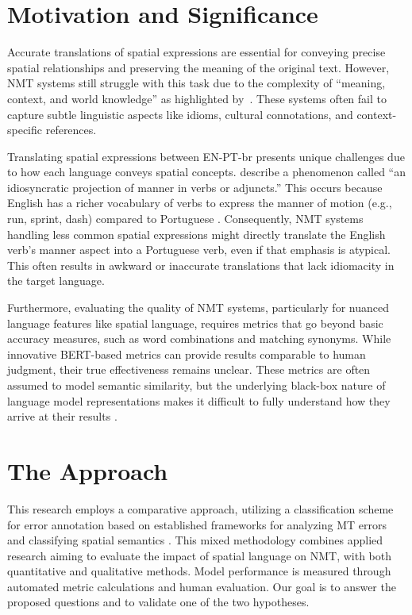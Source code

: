 \section{Motivation and Significance}

Accurate translations of spatial expressions are essential for conveying precise spatial relationships and preserving the meaning of the original text. However, NMT systems still struggle with this task due to the complexity of ``meaning, context, and world knowledge'' as highlighted by~\textcite[p.18]{house2018}. These systems often fail to capture subtle linguistic aspects like idioms, cultural connotations, and context-specific references.

Translating spatial expressions between EN-PT-br presents unique challenges due to how each language conveys spatial concepts. \textcite{fernandes-etal-2024-spatial} describe a phenomenon called ``an idiosyncratic projection of manner in verbs or adjuncts.'' This occurs because English has a richer vocabulary of verbs to express the manner of motion (e.g., run, sprint, dash) compared to Portuguese \parencite{Slobin-2004}. Consequently, NMT systems handling less common spatial expressions might directly translate the English verb's manner aspect into a Portuguese verb, even if that emphasis is atypical. This often results in awkward or inaccurate translations that lack idiomacity in the target language.

Furthermore, evaluating the quality of NMT systems, particularly for nuanced language features like spatial language, requires metrics that go beyond basic accuracy measures, such as word combinations and matching synonyms. While innovative BERT-based metrics can provide results comparable to human judgment, their true effectiveness remains unclear. These metrics are often assumed to model semantic similarity, but the underlying black-box nature of language model representations makes it difficult to fully understand how they arrive at their results \parencite{kaster-etal-2021-global}.


\section{The Approach}

This research employs a comparative approach, utilizing a classification scheme for error annotation based on established frameworks for analyzing MT errors \parencite{popovic-2018, Moorkens-2018} and classifying spatial semantics \parencite{talmy2000toward, talmy2000towardb, slobin2005relating}. This mixed methodology combines applied research aiming to evaluate the impact of spatial language on NMT, with both quantitative and qualitative methods. Model performance is measured through automated metric calculations and human evaluation. Our goal is to answer the proposed questions and to validate one of the two hypotheses.

